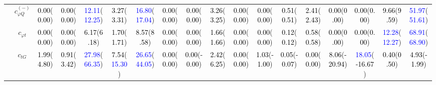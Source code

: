 \documentclass{article}
\begin{document}
\begin{landscape}
\begin{table}[H]
\begin{tabular}{|c|c|c|c|c|c|c|c|c|c|c|c|c|c|c|c|c|c|}
 & $c_{\varphi Q}^{(-)}$ & \textcolor{black}{0.00}(\textcolor{black}{0.00}) & \textcolor{black}{0.00}(\textcolor{black}{0.00}) & \textcolor{blue}{12.11}(\textcolor{blue}{12.25}) & \textcolor{black}{3.27}(\textcolor{black}{3.31}) & \textcolor{blue}{16.80}(\textcolor{blue}{17.04}) & \textcolor{black}{0.00}(\textcolor{black}{0.00}) & \textcolor{black}{0.00}(\textcolor{black}{0.00}) & \textcolor{black}{3.26}(\textcolor{black}{3.25}) & \textcolor{black}{0.00}(\textcolor{black}{0.00}) & \textcolor{black}{0.00}(\textcolor{black}{0.00}) & \textcolor{black}{0.51}(\textcolor{black}{0.51}) & \textcolor{black}{2.41}(\textcolor{black}{2.43}) & \textcolor{black}{0.00}(\textcolor{black}{0.00}) & \textcolor{black}{0.00}(\textcolor{black}{0.00}) & \textcolor{black}{9.66}(\textcolor{black}{9.59}) & \textcolor{blue}{51.97}(\textcolor{blue}{51.61})\\ \cline{2-18}
 & $c_{\varphi t}$ & \textcolor{black}{0.00}(\textcolor{black}{0.00}) & \textcolor{black}{0.00}(\textcolor{black}{0.00}) & \textcolor{black}{6.17}(\textcolor{black}{6.18}) & \textcolor{black}{1.70}(\textcolor{black}{1.71}) & \textcolor{black}{8.57}(\textcolor{black}{8.58}) & \textcolor{black}{0.00}(\textcolor{black}{0.00}) & \textcolor{black}{0.00}(\textcolor{black}{0.00}) & \textcolor{black}{1.66}(\textcolor{black}{1.66}) & \textcolor{black}{0.00}(\textcolor{black}{0.00}) & \textcolor{black}{0.00}(\textcolor{black}{0.00}) & \textcolor{black}{0.12}(\textcolor{black}{0.12}) & \textcolor{black}{0.58}(\textcolor{black}{0.58}) & \textcolor{black}{0.00}(\textcolor{black}{0.00}) & \textcolor{black}{0.00}(\textcolor{black}{0.00}) & \textcolor{blue}{12.28}(\textcolor{blue}{12.27}) & \textcolor{blue}{68.91}(\textcolor{blue}{68.90})\\ \cline{2-18}
 & $c_{tG}$ & \textcolor{black}{1.99}(\textcolor{black}{4.80}) & \textcolor{black}{0.91}(\textcolor{black}{3.42}) & \textcolor{blue}{27.98}(\textcolor{blue}{66.35}) & \textcolor{black}{7.54}(\textcolor{blue}{15.30}) & \textcolor{blue}{26.65}(\textcolor{blue}{44.05}) & \textcolor{black}{0.00}(\textcolor{black}{0.00}) & \textcolor{black}{0.00}(\textcolor{black}{-0.00}) & \textcolor{black}{2.42}(\textcolor{black}{6.25}) & \textcolor{black}{0.00}(\textcolor{black}{0.00}) & \textcolor{black}{1.03}(\textcolor{black}{-1.00}) & \textcolor{black}{0.05}(\textcolor{black}{-0.07}) & \textcolor{black}{0.00}(\textcolor{black}{0.00}) & \textcolor{black}{8.06}(\textcolor{black}{-20.94}) & \textcolor{blue}{18.05}(\textcolor{black}{-16.67}) & \textcolor{black}{0.40}(\textcolor{black}{0.50}) & \textcolor{black}{4.93}(\textcolor{black}{-1.99})\\ \cline{2-18}

\end{tabular}
\end{table}
\end{landscape}
\end{document}
